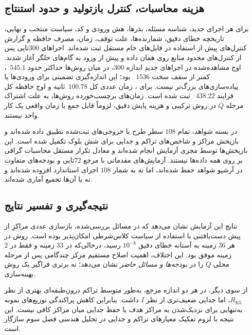 \subsection{هزینه محاسبات، کنترل بازتولید و حدود استنتاج}
\label{subsec:ch4-inverse-interpretation}
برای هر اجرای جدید، شناسه مسئله، بذرها، هش ورودی و کد، سیاست منتخب و نهایی، تاریخچه خطای دقیق، شمارنده‌ها، علت توقف، زمان، مصرف حافظه و گزارش کنترل‌های پیش از استفاده در فایل‌های خام مستقل ثبت شده‌اند. اجراهای $300$تایی پس از کنترل‌های محدود منابع روی همان داده و پیش از ورود به گام‌های حلگر آغاز شدند. اوج  مشاهده‌شده در اجراهای جدیدِ اندازه $300$، در میان روش‌ها حداکثر حدود $545.1$~، کمتر از سقف سخت $1536$~ بود؛ این اندازه‌گیری تضمینی برای ورودی‌ها یا پیاده‌سازی‌های بزرگ‌تر نیست. برای ، زمان عددی کل $100.78$~ثانیه و اوج حافظه کل فرایند $438.22$~ ثبت شده است. زمان‌های برچسب‌خورده روش‌ها، به علت اشتراک مرحله $Q$ در روش ترکیبی و هزینه پایش دقیق، لزوماً قابل جمع با زمان واقعی یک کار واحد نیستند.

در بسته شواهد، تمام $108$ سطر طرح با خروجی‌های ثبت‌شده تطبیق داده شده‌اند و بازپخش مراکز و شاخص‌های تراکم و جدایی برای شش بلوک تکمیل شده است. این بازپخش‌ها توسط مجری آزمایش انجام شده‌اند و معادل تکرار مستقل محاسبات گرافی بر روی همه داده‌ها نیستند. آزمایش‌های مقدماتی با مرجع $72$تایی و بودجه‌های متفاوت در آرشیو شواهد حفظ شده‌اند، اما نه به شمار $108$ اجرای استاندارد افزوده شده‌اند و نه با آن‌ها تجمیع آماری شده‌اند.

\subsection{نتیجه‌گیری و تفسیر نتایج}
\label{subsec:ch4-inverse-conclusion}
نتایج این آزمایش نشان می‌دهد که در مسائل بررسی‌شده، بازسازی عددی مراکزِ از پیش دست‌یافتنی با استفاده از سیاست کلاس‌شرطی امکان‌پذیر بوده است. روش  در هر $36$ زمینه به آستانه خطای دقیق $10^{-8}$ رسید، درحالی‌که  در $33$ زمینه و  فقط در $2$ زمینه موفق بود. این اختلاف، اهمیت اصلاح مستقیم مرکز چندگامی پس از مرحله محلی $Q$ را در \emph{بودجه‌ها و مسائل حاضر} نشان می‌دهد؛ نه برتری فراگیر یک روش بهینه‌سازی.

از سوی دیگر، در هر دو اندازه مرجع،  به‌طور متوسط تراکم درون‌طبقه‌ای بهتری از نظر $R_{\mathrm{KL}}$، اما جدایی ضعیف‌تری از نظر $I$ داشت. بنابراین کاهش پراکندگی توزیع‌های نمونه به‌تنهایی برای نزدیک‌شدن به مراکز هدف یا حفظ جدایی میان مراکز کافی نیست. این نتیجه با لزوم تفکیک معیارهای تراکم و جدایی در تحلیل هندسی فصل سوم سازگار است.

